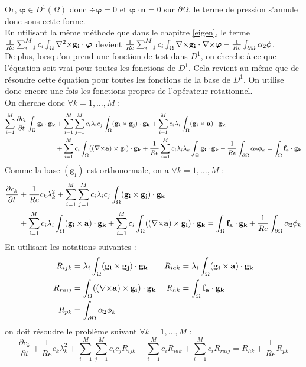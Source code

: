 Or, $\bm{\varphi}\in D^1(\Omega)$ donc $\div\bm{\varphi}=0$ et $\bm{\varphi}\cdot \mathbf{n}=0$ sur $\partial\Omega$, le terme de pression s'annule donc sous cette forme.\\
En utilisant la même méthode que dans le chapitre \ref{eigen}, le terme $\frac{1}{Re}\sum_{i=1}^Mc_i\int_\Omega{\nabla^2\times}\mathbf{g_i}\cdot\bm{\varphi}$ devient $\frac{1}{Re}\sum_{i=1}^Mc_i\int_\Omega{\nabla\times}\mathbf{g_i}\cdot{\nabla\times}\bm{\varphi} -\frac{1}{Re}\int_{\partial\Omega} \alpha_2\phi$.\\
De plus, lorsqu'on prend une fonction de test dans $D^1$, on cherche à ce que l'équation soit vrai pour toutes les fonctions de $D^1$. Cela revient au même que de résoudre cette équation pour toutes les fonctions de la base de $D^1$. On utilise donc encore une fois les fonctions propres de l'opérateur rotationnel.\\
On cherche donc $\forall k=1,\dots,M$ :
\begin{align*}
\sum_{i=1}^M\frac{\partial c_i}{\partial t}\int_\Omega\mathbf{g_i}\cdot\mathbf{g_k} &+ \sum_{i=1}^M\sum_{j=1}^Mc_i\lambda_ic_j\int_\Omega(\mathbf{g_i}\times \mathbf{g_j})\cdot\mathbf{g_k} + \sum_{i=1}^Mc_i\lambda_i\int_\Omega(\mathbf{g_i}\times \mathbf{a})\cdot\mathbf{g_k}\\
& +  \sum_{i=1}^Mc_i\int_\Omega(({\nabla\times}\mathbf{a})\times \mathbf{g_i})\cdot\mathbf{g_k} +\frac{1}{Re}\sum_{i=1}^Mc_i\lambda_i\lambda_k\int_\Omega\mathbf{g_i}\cdot\mathbf{g_k}-\frac{1}{Re}\int_{\partial\Omega} \alpha_2\phi_k = \int_\Omega\mathbf{f_a}\cdot\mathbf{g_k}\\
\end{align*}
Comme la base $(\mathbf{g_i})$ est orthonormale, on a $\forall k=1,\dots,M$ :
\begin{align*}
\frac{\partial c_k}{\partial t} &+ \frac{1}{Re}c_k\lambda_k^2 + \sum_{i=1}^M\sum_{j=1}^Mc_i\lambda_ic_j\int_\Omega(\mathbf{g_i}\times \mathbf{g_j})\cdot\mathbf{g_k}\\
& + \sum_{i=1}^Mc_i\lambda_i\int_\Omega(\mathbf{g_i}\times \mathbf{a})\cdot\mathbf{g_k} +  \sum_{i=1}^Mc_i\int_\Omega(({\nabla\times}\mathbf{a})\times \mathbf{g_i})\cdot\mathbf{g_k} = \int_\Omega\mathbf{f_a}\cdot\mathbf{g_k}+\frac{1}{Re}\int_{\partial\Omega} \alpha_2\phi_k\\
\end{align*}
En utilisant les notations suivantes :
\begin{align*}
R_{ijk} &= \lambda_i\int_\Omega(\mathbf{g_i}\times \mathbf{g_j})\cdot\mathbf{g_k} & R_{iak} &= \lambda_i\int_\Omega(\mathbf{g_i}\times \mathbf{a})\cdot\mathbf{g_k}\\
R_{raij} &= \int_\Omega(({\nabla\times}\mathbf{a})\times \mathbf{g_i})\cdot\mathbf{g_k} & R_{hk} &= \int_\Omega\mathbf{f_a}\cdot\mathbf{g_k}\\
R_{pk} &= \int_{\partial\Omega} \alpha_2\phi_k
\end{align*}
on doit résoudre le problème suivant $\forall k=1,\dots,M$ :
\begin{equation}\label{fvc}
\frac{\partial c_k}{\partial t} + \frac{1}{Re}c_k\lambda_k^2 + \sum_{i=1}^M\sum_{j=1}^Mc_ic_jR_{ijk} + \sum_{i=1}^Mc_iR_{iak} + \sum_{i=1}^Mc_iR_{raij} = R_{hk} + \frac{1}{Re}R_{pk}
\end{equation}

